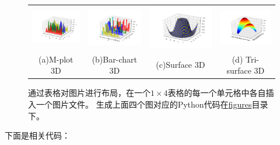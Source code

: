 \begin{figure}[!h]
	\centering
	\begin{tabular}{@{}cccc@{}}
		\includegraphics[width=.25\textwidth]{figures/mplot3d}  &
		\includegraphics[width=.25\textwidth]{figures/bar3d}  &
		\includegraphics[width=.25\textwidth]{figures/surface3d} &
		\includegraphics[width=.25\textwidth]{figures/trisurf3d} \\
		(a)M-plot 3D & (b)Bar-chart 3D & 
		(c)Surface 3D & (d) Tri-surface 3D \\
	\end{tabular}
	\caption{通过表格对图片进行布局，在一个$1\times4$表格的每一个单元格中各自插入一个图片文件。
		生成上面四个图对应的Python代码在\href{https://github.com/zeakey/shu-thesis/tree/master/figures}{figures}目录下。}
	\label{fig:fig3d}
\end{figure}
下面是相关代码：
